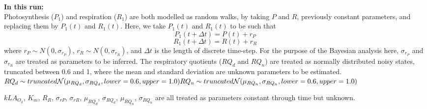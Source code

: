 \documentclass{ruthesis}
\begin{document}
\textbf{In this run:}\\
Photosynthesis ($P_1$) and respiration ($R_1$) are both modelled as random walks, by taking \begin{math}P\end{math} and \begin{math}R\end{math}, previously constant parameters, and replacing them by \begin{math}P_1(t)\end{math} and \begin{math}R_1(t)\end{math}. Here, we take \begin{math}P_1(t)\end{math} and \begin{math}R_1(t)\end{math} to be such that
\begin{displaymath}
P_1(t+\Delta t) = P(t) + r_P
\end{displaymath}
\begin{displaymath}
R_1(t+\Delta t) = R(t) + r_R
\end{displaymath}
where \begin{math}
r_P \sim N(0, \sigma_{r_P})
\end{math}, \begin{math}
r_R \sim N(0, \sigma_{r_R})
\end{math}, and \begin{math}
\Delta t
\end{math} is the length of discrete time-step. For the purpose of the Bayesian analysis here, \begin{math}\sigma_{r_P}\end{math} and \begin{math}\sigma_{r_R}\end{math} are treated as parameters to be inferred.  
The respiratory quotients ($RQ_d$ and $RQ_n$) are treated as normally distributed noisy states, truncated between 0.6 and 1, where the mean and standard deviation are unknown parameters to be estimated. \\
$
RQ_d \sim truncated\mathcal{N}(\mu_{RQ_d}, \sigma_{RQ_d}, lower = 0.6, upper = 1.0) \\
RQ_n \sim truncated\mathcal{N}(\mu_{RQ_n}, \sigma_{RQ_n}, lower = 0.6, upper = 1.0) \\ $

$kLA_{O_2}$, $K_m$, $R_R$, $\sigma_{rP}$, $\sigma_{rR}$, $\mu_{RQ_d}$, $\sigma_{RQ_d}$, $\mu_{RQ_n}$, $\sigma_{RQ_n}$ are all treated as parameters constant through time but unknown. 
\end{document}

